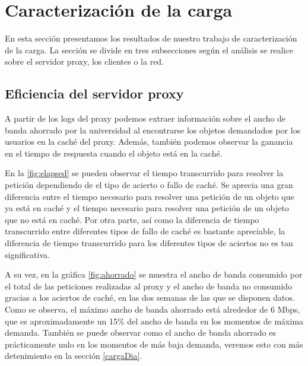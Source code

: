 \documentclass[twocolumn]{Jornadas}
\begin{document}
\section{Caracterización de la carga}
\label{resultados}

En esta sección presentamos los resultados de nuestro trabajo de caracterización de la carga. La sección se divide en tres subsecciones según el análisis se realice sobre el servidor proxy, los clientes o la red.

\subsection{Eficiencia del servidor proxy}
A partir de los logs del proxy podemos extraer información sobre el ancho de banda ahorrado por la universidad al encontrarse los objetos demandados por los usuarios en la caché del proxy. Además, también podemos observar la ganancia en el tiempo de respuesta cuando el objeto está en la caché.

En la \ref{fig:elapsed} se pueden observar el tiempo transcurrido para resolver la petición dependiendo de el tipo de acierto o fallo de caché. Se aprecia una gran diferencia entre el tiempo necesario para resolver una petición de un objeto que ya está en caché y el tiempo necesario para resolver una petición de un objeto que no está en caché. Por otra parte, así como la diferencia de tiempo transcurrido entre diferentes tipos de fallo de caché es bastante apreciable, la diferencia de tiempo transcurrido para los diferentes tipos de aciertos no es tan significativa.

A su vez, en la gráfica \ref{fig:ahorrado} se muestra el ancho de banda consumido por el total de las peticiones realizadas al proxy y el ancho de banda no consumido gracias a los aciertos de caché, en las dos semanas de las que se disponen datos. Como se observa, el máximo ancho de banda ahorrado está alrededor de 6 Mbps, que es aproximadamente un 15\% del ancho de banda en los momentos de máxima demanda. También se puede observar como el ancho de banda ahorrado es prácticamente nulo en los momentos de más baja demanda, veremos esto con más detenimiento en la sección \ref{cargaDia}.
\end{document}
